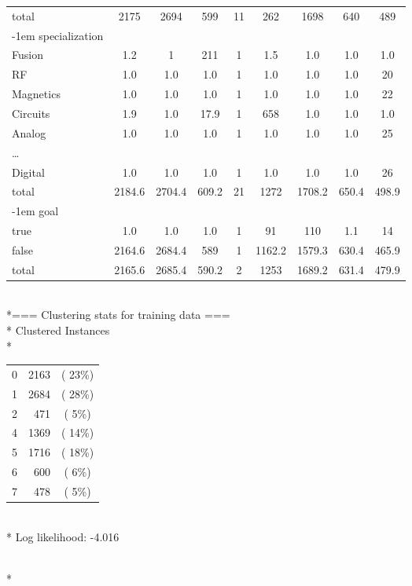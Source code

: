 \begin{tt}
\begin{footnotesize}
\begin{tabular}{lcccccccc}
total&2175&2694&599&11&262&1698&640&489\\
\kern-1em specialization\\ 
Fusion&1.2&1&211&1&1.5&1.0&1.0&1.0\\ 
RF&1.0&1.0&1.0&1&1.0&1.0&1.0&20\\ 
Magnetics&1.0&1.0&1.0&1&1.0&1.0&1.0&22\\
Circuits&1.9&1.0&17.9&1&658&1.0&1.0&1.0\\
Analog&1.0&1.0&1.0&1&1.0&1.0&1.0&25\\ 
\ldots&&&&&&&&\\
Digital&1.0&1.0&1.0&1&1.0&1.0&1.0&26\\
total&2184.6&2704.4&609.2&21&1272&1708.2&650.4&498.9\\
\kern-1em goal\\ 
true&1.0&1.0&1.0&1&91&110&1.1&14\\
false&2164.6&2684.4&589&1&1162.2&1579.3&630.4&465.9\\ 
total&2165.6&2685.4&590.2&2&1253&1689.2&631.4&479.9\\
\end{tabular}
\\*=== Clustering stats for training data ===\\*
Clustered Instances\\*
\begin{tabular}{lrc} 
0&2163&( 23\%)\\*
1&2684&( 28\%)\\*
2&471&(  5\%)\\*
4&1369&( 14\%)\\*
5&1716&( 18\%)\\*
6&600&(  6\%)\\*
7&478&(  5\%)\\*
\end{tabular}
\\*
\noindent Log likelihood: -4.016
\end{footnotesize}
\end{tt}\\*

\vspace*{-13mm}
